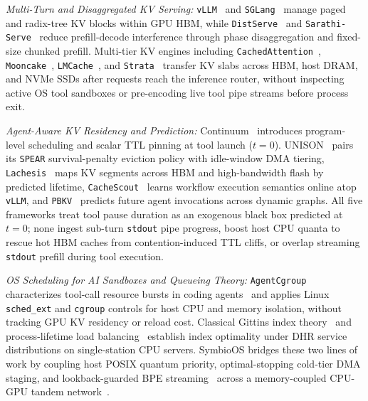 \documentclass[10pt,journal,compsoc]{IEEEtran}
\theoremstyle{definition}
\theoremstyle{remark}
\newcommand{\SymbioOS}{\textup{\textsc{SymbioOS}}}
\newcommand{\Continuum}{\textup{\textsc{Continuum}}}
\newcommand{\UNISON}{\textup{\textsc{UNISON}}}
\def\SymbioOS{SymbioOS}%
\def\Continuum{Continuum}%
\def\UNISON{UNISON}%
\begin{document}
\emph{Multi-Turn and Disaggregated KV Serving:} \texttt{vLLM}~\cite{kwon2023vllm} and \texttt{SGLang}~\cite{zheng2024sglang} manage paged and radix-tree KV blocks within GPU HBM, while \texttt{DistServe}~\cite{zhong2024distserve} and \texttt{Sarathi-Serve}~\cite{agrawal2024sarathi} reduce prefill-decode interference through phase disaggregation and fixed-size chunked prefill. Multi-tier KV engines including \texttt{CachedAttention}~\cite{gao2024cachedattention}, \texttt{Mooncake}~\cite{qin2025mooncake}, \texttt{LMCache}~\cite{cheng2025lmcache}, and \texttt{Strata}~\cite{xie2026strata} transfer KV slabs across HBM, host DRAM, and NVMe SSDs after requests reach the inference router, without inspecting active OS tool sandboxes or pre-encoding live tool pipe streams before process exit.

\emph{Agent-Aware KV Residency and Prediction:} \Continuum{}~\cite{li2025continuum} introduces program-level scheduling and scalar TTL pinning at tool launch ($t = 0$). \UNISON{}~\cite{he2026unison} pairs its \texttt{SPEAR} survival-penalty eviction policy with idle-window DMA tiering, \texttt{Lachesis}~\cite{yang2026lachesis} maps KV segments across HBM and high-bandwidth flash by predicted lifetime, \texttt{CacheScout}~\cite{zhang2026cachescout} learns workflow execution semantics online atop \texttt{vLLM}, and \texttt{PBKV}~\cite{zheng2026pbkv} predicts future agent invocations across dynamic graphs. All five frameworks treat tool pause duration as an exogenous black box predicted at $t = 0$; none ingest sub-turn \texttt{stdout} pipe progress, boost host CPU quanta to rescue hot HBM caches from contention-induced TTL cliffs, or overlap streaming \texttt{stdout} prefill during tool execution.

\emph{OS Scheduling for AI Sandboxes and Queueing Theory:} \texttt{AgentCgroup}~\cite{zheng2026agentcgroup} characterizes tool-call resource bursts in coding agents~\cite{yang2024sweagent,wang2025openhands} and applies Linux \texttt{sched\_ext} and \texttt{cgroup} controls for host CPU and memory isolation, without tracking GPU KV residency or reload cost. Classical Gittins index theory~\cite{gittins1979bandit,aalto2009gittins,scully2020gittins} and process-lifetime load balancing~\cite{harcholbalter1997exploiting} establish index optimality under DHR service distributions on single-station CPU servers. \SymbioOS{} bridges these two lines of work by coupling host POSIX quantum priority, optimal-stopping cold-tier DMA staging, and lookback-guarded BPE streaming~\cite{sennrich2016bpe} across a memory-coupled CPU-GPU tandem network~\cite{neely2010stochastic}.
\end{document}
